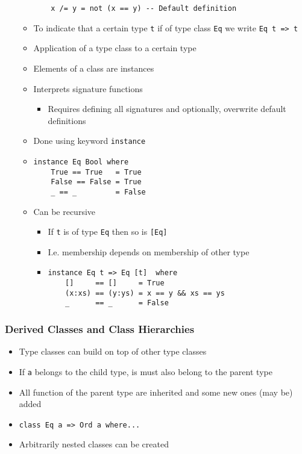 \begin{itemize}
\begin{itemize}
\begin{verbatim}
    x /= y = not (x == y) -- Default definition
\end{verbatim}
            \item To indicate that a certain type \verb+t+ if of type class \verb+Eq+ we write \verb+Eq t => t+
        \end{itemize}
        \begin{itemize}
            \item Application of a type class to a certain type
            \item Elements of a class are instances
            \item Interprets signature functions
                \begin{itemize}
                    \item Requires defining all signatures and optionally, overwrite default definitions
                \end{itemize}
            \item Done using keyword \verb+instance+
            \item 
\begin{verbatim}
instance Eq Bool where
    True == True   = True
    False == False = True
    _ == _         = False
\end{verbatim}
            \item Can be recursive
                \begin{itemize}
                    \item If \verb+t+ is of type \verb+Eq+ then so is \verb+[Eq]+
                    \item I.e. membership depends on membership of other type
                    \item 
\begin{verbatim}
instance Eq t => Eq [t]  where
    []     == []     = True
    (x:xs) == (y:ys) = x == y && xs == ys
    _      == _      = False
\end{verbatim}

                \end{itemize}
        \end{itemize}
\end{itemize}

\subsubsection{Derived Classes and Class Hierarchies}
\begin{itemize}
    \item Type classes can build on top of other type classes
    \item If \verb+a+ belongs to the child type, is must also belong to the parent type
    \item All function of the parent type are inherited and some new ones (may be) added
    \item
\begin{verbatim}
class Eq a => Ord a where... 
\end{verbatim}
    \item Arbitrarily nested classes can be created
\end{itemize}

